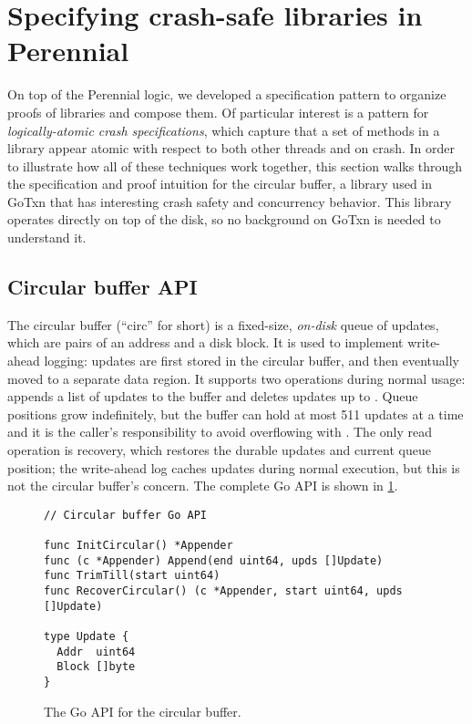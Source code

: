 \section{Specifying crash-safe libraries in Perennial}
\label{sec:perennial:crash-hocap}

On top of the Perennial logic, we developed a specification pattern to organize proofs
of libraries and compose them. Of particular interest is a pattern for
\emph{logically-atomic crash specifications}, which capture that a set of
methods in a library appear atomic with respect to both other threads and on
crash. In order to illustrate how all of these techniques work together, this
section walks through the specification and proof intuition for the circular
buffer, a library used in GoTxn that has interesting crash safety and
concurrency behavior. This library operates directly on top of the disk, so no
background on GoTxn is needed to understand it.

\subsection{Circular buffer API}

The circular buffer (``circ'' for short) is a fixed-size, \emph{on-disk} queue of
updates, which are pairs of an address and a disk block. It is used to implement
write-ahead logging: updates are first stored in the circular buffer, and
then eventually moved to a separate data region. It supports two operations
during normal usage:  appends a list of updates to the buffer
and  deletes updates up to . Queue positions grow
indefinitely, but the buffer can hold at most 511 updates at a time and it
is the caller's responsibility to avoid overflowing with . The only
read operation is recovery, which restores the durable updates and current queue
position; the write-ahead log caches updates during normal execution, but this
is not the circular buffer's concern. The complete Go API is shown in
\cref{fig:circ:api}.

\begin{figure}[ht]
\begin{verbatim}
// Circular buffer Go API

func InitCircular() *Appender
func (c *Appender) Append(end uint64, upds []Update)
func TrimTill(start uint64)
func RecoverCircular() (c *Appender, start uint64, upds []Update)

type Update {
  Addr  uint64
  Block []byte
}
\end{verbatim}
  \caption{The Go API for the circular buffer.}%
  \label{fig:circ:api}
\end{figure}

